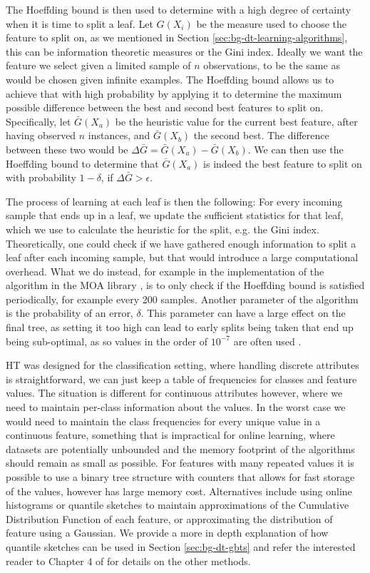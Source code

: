 The Hoeffding bound is then used to determine with a high degree of certainty when
it is time to split a leaf. Let $G(X_i)$ be the measure used to choose the feature
to split on, as we mentioned in Section \ref{sec:bg-dt-learning-algorithms}, this can be
information theoretic measures or the Gini index. Ideally we want the feature we select given a limited sample of $n$ observations, to be the same as would be chosen given infinite examples.
The Hoeffding bound allows us to achieve that with high probability by applying
it to determine the maximum possible difference between the best and second best
features to split on. Specifically, let $\bar{G}(X_a)$ be the heuristic value for the
current best feature, after having observed $n$ instances, and $\bar{G}(X_b)$ the second
best. The difference between these two would be $\Delta \bar{G} = \bar{G}(X_a) - \bar{G}(X_b)$.
We can then use the Hoeffding bound to determine that $\bar{G}(X_a)$ is indeed the
best feature to split on with probability $1-\delta$, if $\Delta \bar{G} > \epsilon$.

The process of learning at each leaf is then the following: For every incoming sample
that ends up in a leaf, we update the sufficient statistics for that leaf, which we
use to calculate the heuristic for the split, e.g. the Gini index. Theoretically,
one could check if we have gathered enough information to split a leaf after each
incoming sample, but that would introduce a large computational overhead. What we
do instead, for example in the implementation of the algorithm in the MOA library \cite{bifet2010moa},
is to only check if the Hoeffding bound is satisfied periodically, for example
every 200 samples. Another parameter of the algorithm is the probability of an error,
$\delta$. This parameter can have a large effect on the final tree, as setting it
too high can lead to early splits being taken that end up being sub-optimal, as so
values in the order of $10^{-7}$ are often used \cite{data-stream-mining}.

HT was designed for the classification setting, where handling discrete attributes
is straightforward, we can just keep a table of frequencies for classes and feature
values. The situation
is different for continuous attributes however, where we need to maintain per-class
information about the values. In the worst case we would need to maintain the class
frequencies for every unique value in a continuous feature, something that is impractical
for online learning, where datasets are potentially unbounded and the memory footprint
of the algorithms should remain as small as possible. For features with many repeated
values it is possible to use a binary tree structure with counters that allows for
fast storage of the values, however has large memory cost. Alternatives include
using online histograms or quantile sketches \cite{greenwald2016quantiles}
to maintain approximations of the Cumulative Distribution Function of
each feature, or approximating the distribution of feature using a Gaussian.
We provide a more in depth explanation of how quantile sketches can be used
in Section \ref{sec:bg-dt-gbts} and refer the interested reader to Chapter 4 of \citet{data-stream-mining} for details on the other methods.

